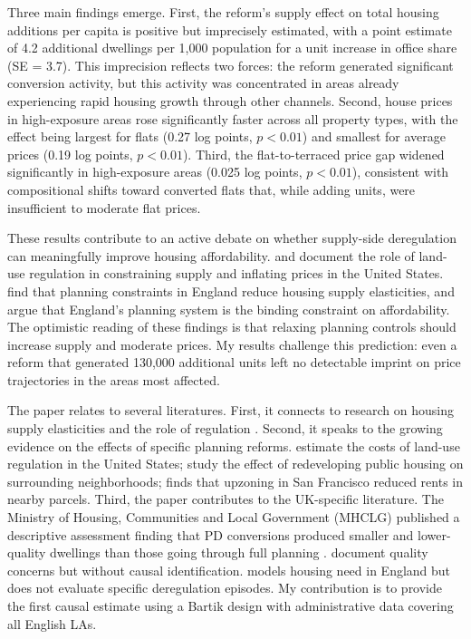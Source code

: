 \documentclass[12pt]{article}
\begin{document}
Three main findings emerge. First, the reform's supply effect on total housing additions per capita is positive but imprecisely estimated, with a point estimate of 4.2 additional dwellings per 1,000 population for a unit increase in office share (SE = 3.7). This imprecision reflects two forces: the reform generated significant conversion activity, but this activity was concentrated in areas already experiencing rapid housing growth through other channels. Second, house prices in high-exposure areas rose significantly faster across all property types, with the effect being largest for flats (0.27 log points, $p < 0.01$) and smallest for average prices (0.19 log points, $p < 0.01$). Third, the flat-to-terraced price gap widened significantly in high-exposure areas (0.025 log points, $p < 0.01$), consistent with compositional shifts toward converted flats that, while adding units, were insufficient to moderate flat prices.

These results contribute to an active debate on whether supply-side deregulation can meaningfully improve housing affordability. \citet{glaeser2005} and \citet{gyourko2008} document the role of land-use regulation in constraining supply and inflating prices in the United States. \citet{hilber2016} find that planning constraints in England reduce housing supply elasticities, and \citet{cheshire2018} argue that England's planning system is the binding constraint on affordability. The optimistic reading of these findings is that relaxing planning controls should increase supply and moderate prices. My results challenge this prediction: even a reform that generated 130,000 additional units left no detectable imprint on price trajectories in the areas most affected.

The paper relates to several literatures. First, it connects to research on housing supply elasticities and the role of regulation \citep{saiz2010, baum2020, hilber2019}. Second, it speaks to the growing evidence on the effects of specific planning reforms. \citet{turner2014} estimate the costs of land-use regulation in the United States; \citet{murphy2018} study the effect of redeveloping public housing on surrounding neighborhoods; \citet{pennington2021} finds that upzoning in San Francisco reduced rents in nearby parcels. Third, the paper contributes to the UK-specific literature. The Ministry of Housing, Communities and Local Government (MHCLG) published a descriptive assessment finding that PD conversions produced smaller and lower-quality dwellings than those going through full planning \citep{mhclg2020}. \citet{clifford2018} document quality concerns but without causal identification. \citet{bramley2013} models housing need in England but does not evaluate specific deregulation episodes. My contribution is to provide the first causal estimate using a Bartik design with administrative data covering all English LAs.
\end{document}
